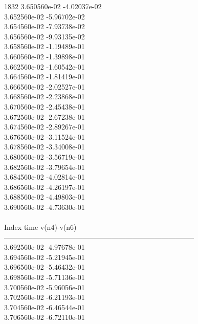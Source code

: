 1832	3.650560e-02	-4.02037e-02	\\ 	3.652560e-02	-5.96702e-02	\\ 	3.654560e-02	-7.93738e-02	\\ 	3.656560e-02	-9.93135e-02	\\ 	3.658560e-02	-1.19489e-01	\\ 	3.660560e-02	-1.39898e-01	\\ 	3.662560e-02	-1.60542e-01	\\ 	3.664560e-02	-1.81419e-01	\\ 	3.666560e-02	-2.02527e-01	\\ 	3.668560e-02	-2.23868e-01	\\ 	3.670560e-02	-2.45438e-01	\\ 	3.672560e-02	-2.67238e-01	\\ 	3.674560e-02	-2.89267e-01	\\ 	3.676560e-02	-3.11524e-01	\\ 	3.678560e-02	-3.34008e-01	\\ 	3.680560e-02	-3.56719e-01	\\ 	3.682560e-02	-3.79654e-01	\\ 	3.684560e-02	-4.02814e-01	\\ 	3.686560e-02	-4.26197e-01	\\ 	3.688560e-02	-4.49803e-01	\\ 	3.690560e-02	-4.73630e-01	\\ \hline
\\ \hline
Index   time            v(n4)-v(n6)     \\ \hline
--------------------------------------------------------------------------------\\ 	3.692560e-02	-4.97678e-01	\\ 	3.694560e-02	-5.21945e-01	\\ 	3.696560e-02	-5.46432e-01	\\ 	3.698560e-02	-5.71136e-01	\\ 	3.700560e-02	-5.96056e-01	\\ 	3.702560e-02	-6.21193e-01	\\ 	3.704560e-02	-6.46544e-01	\\ 	3.706560e-02	-6.72110e-01	\\ \hline
